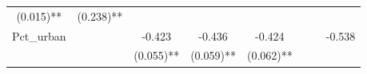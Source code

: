\documentclass[12pt,twoside]{reedthesis}
\begin{document}
\begin{longtable}[]{@{}cccccccc@{}}
\begin{minipage}[t]{0.09\columnwidth}
  (0.015)**\strut
  \end{minipage} & \begin{minipage}[t]{0.10\columnwidth}\centering\strut
  (0.238)**\strut
  \end{minipage}\tabularnewline
  \begin{minipage}[t]{0.12\columnwidth}\centering\strut
  Pct\_urban\strut
  \end{minipage} & \begin{minipage}[t]{0.09\columnwidth}\centering\strut
  \strut
  \end{minipage} & \begin{minipage}[t]{0.09\columnwidth}\centering\strut
  -0.423\strut
  \end{minipage} & \begin{minipage}[t]{0.09\columnwidth}\centering\strut
  -0.436\strut
  \end{minipage} & \begin{minipage}[t]{0.09\columnwidth}\centering\strut
  -0.424\strut
  \end{minipage} & \begin{minipage}[t]{0.09\columnwidth}\centering\strut
  \strut
  \end{minipage} & \begin{minipage}[t]{0.09\columnwidth}\centering\strut
  \strut
  \end{minipage} & \begin{minipage}[t]{0.10\columnwidth}\centering\strut
  -0.538\strut
  \end{minipage}\tabularnewline
  \begin{minipage}[t]{0.12\columnwidth}\centering\strut
  \strut
  \end{minipage} & \begin{minipage}[t]{0.09\columnwidth}\centering\strut
  \strut
  \end{minipage} & \begin{minipage}[t]{0.09\columnwidth}\centering\strut
  (0.055)**\strut
  \end{minipage} & \begin{minipage}[t]{0.09\columnwidth}\centering\strut
  (0.059)**\strut
  \end{minipage} & \begin{minipage}[t]{0.09\columnwidth}\centering\strut
  (0.062)**\strut
  \end{minipage} & \begin{minipage}[t]{0.09\columnwidth}\centering\strut
  \strut
  \end{minipage} & \begin{minipage}[t]{0.09\columnwidth}\centering\strut

\end{minipage}
\end{longtable}
\end{document}
